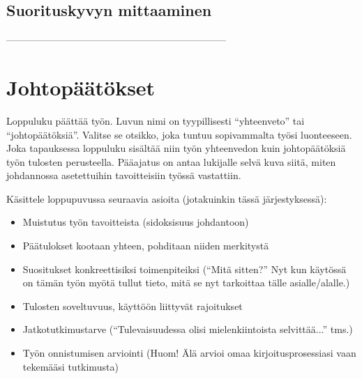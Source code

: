 \subsection{Suorituskyvyn mittaaminen}



\label{sec:esimluku}

 --------------------------------------------------------------------

\section{Johtopäätökset}

Loppuluku päättää työn. Luvun nimi on tyypillisesti ``yhteenveto'' tai
``johtopäätöksiä''. Valitse se otsikko, joka tuntuu sopivammalta työsi
luonteeseen. Joka tapauksessa loppuluku sisältää niin työn yhteenvedon
kuin johtopäätöksiä työn tulosten perusteella. Pääajatus on antaa
lukijalle selvä kuva siitä, miten johdannossa asetettuihin
tavoitteisiin työssä vastattiin.

Käsittele loppupuvussa seuraavia asioita (jotakuinkin tässä järjestyksessä):
%
\begin{itemize}
  \item Muistutus työn tavoitteista (sidoksisuus johdantoon)
  \item Päätulokset kootaan yhteen, pohditaan niiden merkitystä
  \item Suositukset konkreettisiksi toimenpiteiksi (``Mitä sitten?'' 
Nyt kun käytössä on tämän työn myötä tullut tieto, 
mitä se nyt tarkoittaa tälle asialle/alalle.)
  \item Tulosten soveltuvuus, käyttöön liittyvät rajoitukset
  \item Jatkotutkimustarve 
(``Tulevaisuudessa olisi mielenkiintoista selvittää...'' tms.)
  \item Työn onnistumisen arviointi 
(Huom! Älä arvioi omaa kirjoitusprosessiasi vaan tekemääsi tutkimusta)
\end{itemize}



